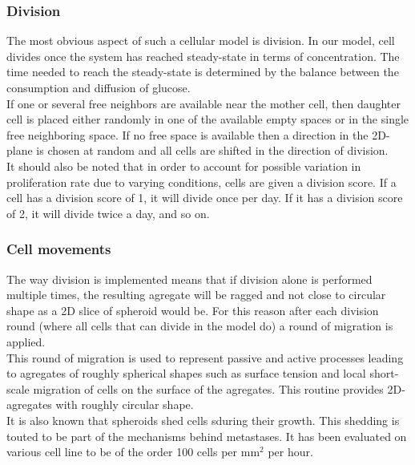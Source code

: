 \documentclass[11pt,a4paper]{article}
\begin{document}
\subsubsection{Division}
The most obvious aspect of such a cellular model is division. In our model, cell divides once the system has reached steady-state in terms of concentration. The time needed to reach the steady-state is determined by the balance between the consumption and diffusion of glucose.\\

If one or several free neighbors are available near the mother cell, then daughter cell is placed either randomly in one of the available empty spaces or in the single free neighboring space. If no free space is available then a direction in the 2D-plane is chosen at random and all cells are shifted in the direction of division.\\

It should also be noted that in order to account for possible variation in proliferation rate due to varying conditions, cells are given a division score. If a cell has a division score of 1, it will divide once per day. If it has a division score of 2, it will divide twice a day, and so on.\\

\subsubsection{Cell movements}
The way division is implemented means that if division alone is performed multiple times, the resulting agregate will be ragged and not close to circular shape as a 2D slice of spheroid would be. For this reason after each division round (where all cells that can divide in the model do) a round of migration is applied.\\

This round of migration is used to represent passive and active processes leading to agregates of roughly spherical shapes such as surface tension and local short-scale migration of cells on the surface of the agregates. This routine provides 2D-agregates with roughly circular shape.\\

It is also known that spheroids shed cells sduring their growth.\cite{Freyer1988}\cite{Menchon2009} This shedding is touted to be part of the mechanisms behind metastases. It has been evaluated on various cell line to be of the order  100 cells per mm$^2$ per hour.\\
\end{document}
